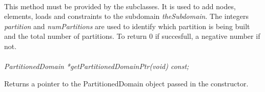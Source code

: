  \\
This method must be provided by the subclasses. It is used to add
nodes, elements, loads and constraints to the subdomain {\em
theSubdomain}. The integers {\em partition} and {\em numPartitions}
are used to identify which partition is being built and the total
number of partitions. To return $0$ if succesfull, a negative number
if not. \\


 \\
{\em  PartitionedDomain *getPartitionedDomainPtr(void) const;} 

Returns a pointer to the PartitionedDomain object passed in the constructor.\\


